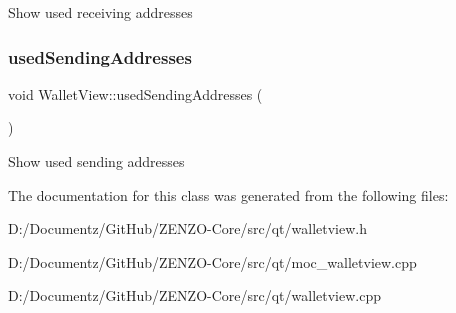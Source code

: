 Show used receiving addresses \mbox{\label{class_wallet_view_a6f0d012c18ea2df7336c852abe2a50d0}} 
\subsubsection{\texorpdfstring{usedSendingAddresses}{usedSendingAddresses}}
{\footnotesize\ttfamily void Wallet\+View\+::used\+Sending\+Addresses (\begin{DoxyParamCaption}{ }\end{DoxyParamCaption})\hspace{0.3cm}{\ttfamily [slot]}}

Show used sending addresses 

The documentation for this class was generated from the following files\+:\begin{DoxyCompactItemize}
\item 
D\+:/\+Documentz/\+Git\+Hub/\+Z\+E\+N\+Z\+O-\/\+Core/src/qt/walletview.\+h\item 
D\+:/\+Documentz/\+Git\+Hub/\+Z\+E\+N\+Z\+O-\/\+Core/src/qt/moc\+\_\+walletview.\+cpp\item 
D\+:/\+Documentz/\+Git\+Hub/\+Z\+E\+N\+Z\+O-\/\+Core/src/qt/walletview.\+cpp\end{DoxyCompactItemize}
